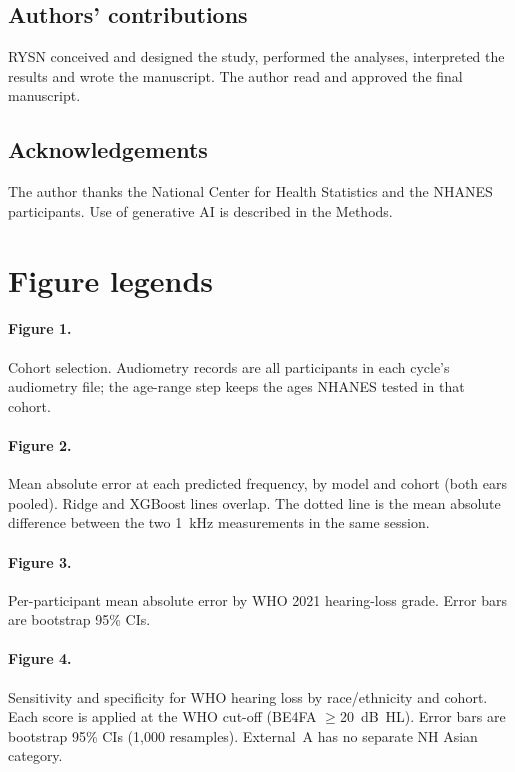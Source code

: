 \documentclass[11pt]{article}
\begin{document}
\subsection*{Authors' contributions}
RYSN conceived and designed the study, performed the analyses, interpreted the results and wrote the manuscript. The author read and approved the final manuscript.

\subsection*{Acknowledgements}
The author thanks the National Center for Health Statistics and the NHANES participants. Use of generative AI is described in the Methods.




\clearpage
\section*{Figure legends}
\paragraph{Figure 1.} Cohort selection. Audiometry records are all participants in each cycle's audiometry file; the age-range step keeps the ages NHANES tested in that cohort.

\paragraph{Figure 2.} Mean absolute error at each predicted frequency, by model and cohort (both ears pooled). Ridge and XGBoost lines overlap. The dotted line is the mean absolute difference between the two 1~kHz measurements in the same session.

\paragraph{Figure 3.} Per-participant mean absolute error by WHO 2021 hearing-loss grade. Error bars are bootstrap 95\% CIs.

\paragraph{Figure 4.} Sensitivity and specificity for WHO hearing loss by race/ethnicity and cohort. Each score is applied at the WHO cut-off (BE4FA $\geq$20~dB~HL). Error bars are bootstrap 95\% CIs (1,000 resamples). External~A has no separate NH Asian category.
\end{document}
